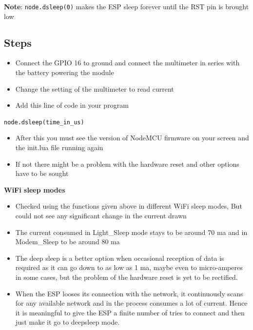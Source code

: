 \documentclass[16pt]{article}
\begin{document}
\vspace{0.3cm}

\textbf{Note}: \texttt{node.dsleep(0)} makes the ESP sleep forever until
the RST pin is brought low


\vspace{0.5cm}
\subsection{Steps}

\begin{itemize}

\item
  Connect the GPIO 16 to ground and connect the multimeter in series
  with the battery powering the module
\item
  Change the setting of the multimeter to read current
\item
  Add this line of code in your program
\end{itemize}

\texttt{node.dsleep(time\_in\_us)}

\begin{itemize}

\item
  After this you must see the version of NodeMCU firmware on your screen
  and the init.lua file running again
\item
  If not there might be a problem with the hardware reset and other
  options have to be sought
\end{itemize}

\textbf{WiFi sleep modes}

\begin{itemize}

\item
  Checked using the functions given above in different WiFi sleep modes,
  But could not see any significant change in the current drawn
\item
  The current consumed in Light\_Sleep mode stays to be around 70 ma and
  in Modem\_Sleep to be aroun\vspace{0.5cm}d 80 ma
\item
  The deep sleep is a better option when occasional reception of data is
  required as it can go down to as low as 1 ma, maybe even to
  micro-amperes in some cases, but the problem of the hardware reset is
  yet to be rectified.
\item
  When the ESP looses its connection with the network, it continuously
  scans for any available network and in the process consumes a lot of
  current. Hence it is meaningful to give the ESP a finite number of
  tries to connect and then just make it go to deepsleep mode.
\end{itemize}
\end{document}
